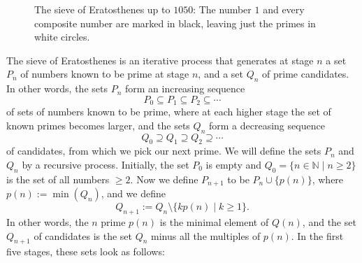 \begin{figure}[!p]
\centering
\tagpdfparaOff
{}
\caption[The sieve of Eratosthenes]{The sieve of Eratosthenes up to $1050$: The number $1$ and every composite number are marked in black, leaving just the primes in white circles.}
\label{figure:sieve-of-eratosthenes}
\end{figure}

The sieve of Eratosthenes is an iterative process that generates at stage $n$ a set $P_n$ of numbers known to be prime at stage $n$, and a set $Q_n$ of prime candidates. In other words, the sets $P_n$ form an increasing sequence
\begin{equation*}
  P_0\subseteq P_1\subseteq P_2 \subseteq \cdots
\end{equation*}
of sets of numbers known to be prime, where at each higher stage the set of known primes becomes larger, and the sets $Q_n$ form a decreasing sequence
\begin{equation*}
  Q_0\supseteq Q_1 \supseteq Q_2 \supseteq \cdots
\end{equation*}
of candidates, from which we pick our next prime. We will define the sets $P_n$ and $Q_n$ by a recursive process. Initially, the set $P_0$ is empty and $Q_0=\{n\in\mathbb{N}\mid n\geq 2\}$ is the set of all numbers $\geq 2$. Now we define $P_{n+1}$ to be $P_n\cup \{p(n)\}$, where $p(n):=\min(Q_n)$, and we define
\begin{equation*}
  Q_{n+1}:=Q_n\setminus \{kp(n)\mid k\geq 1\}.
\end{equation*}
In other words, the $n$\supth{} prime $p(n)$ is the minimal element of $Q(n)$, and the set $Q_{n+1}$ of candidates is the set $Q_n$ minus all the multiples of $p(n)$. In the first five stages, these sets look as follows:


